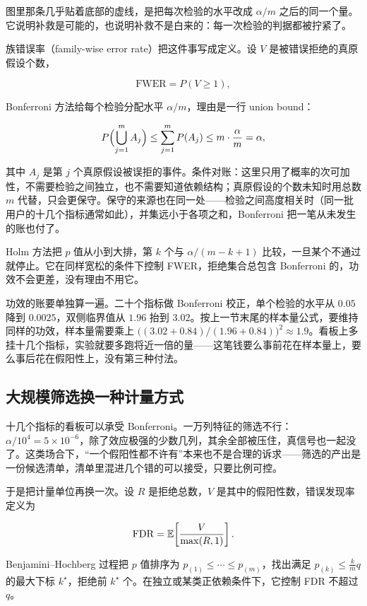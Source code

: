 图里那条几乎贴着底部的虚线，是把每次检验的水平改成 \(\alpha/m\) 之后的同一个量。它说明补救是可能的，也说明补救不是白来的：每一次检验的判据都被拧紧了。

族错误率（family-wise error rate）把这件事写成定义。设 \(V\) 是被错误拒绝的真原假设个数，

\[
\mathrm{FWER}=P(V\ge 1),
\]

Bonferroni 方法给每个检验分配水平 \(\alpha/m\)，理由是一行 union bound：

\[
P\Bigl(\bigcup_{j=1}^{m}A_j\Bigr)\le\sum_{j=1}^{m}P(A_j)\le m\cdot\frac{\alpha}{m}=\alpha ,
\]

其中 \(A_j\) 是第 \(j\) 个真原假设被误拒的事件。条件对账：这里只用了概率的次可加性，不需要检验之间独立，也不需要知道依赖结构；真原假设的个数未知时用总数 \(m\) 代替，只会更保守。保守的来源也在同一处——检验之间高度相关时（同一批用户的十几个指标通常如此），并集远小于各项之和，Bonferroni 把一笔从未发生的账也付了。

Holm 方法把 \(p\) 值从小到大排，第 \(k\) 个与 \(\alpha/(m-k+1)\) 比较，一旦某个不通过就停止。它在同样宽松的条件下控制 FWER，拒绝集合总包含 Bonferroni 的，功效不会更差，没有理由不用它。

功效的账要单独算一遍。二十个指标做 Bonferroni 校正，单个检验的水平从 \(0.05\) 降到 \(0.0025\)，双侧临界值从 \(1.96\) 抬到 \(3.02\)。按上一节末尾的样本量公式，要维持同样的功效，样本量需要乘上 \(\bigl((3.02+0.84)/(1.96+0.84)\bigr)^{2}\approx 1.9\)。看板上多挂十几个指标，实验就要多跑将近一倍的量——这笔钱要么事前花在样本量上，要么事后花在假阳性上，没有第三种付法。

\subsection{大规模筛选换一种计量方式}

十几个指标的看板可以承受 Bonferroni。一万列特征的筛选不行：\(\alpha/10^{4}=5\times 10^{-6}\)，除了效应极强的少数几列，其余全部被压住，真信号也一起没了。这类场合下，``一个假阳性都不许有''本来也不是合理的诉求——筛选的产出是一份候选清单，清单里混进几个错的可以接受，只要比例可控。

于是把计量单位再换一次。设 \(R\) 是拒绝总数，\(V\) 是其中的假阳性数，错误发现率定义为

\[
\mathrm{FDR}=\mathbb{E}\!\left[\frac{V}{\max(R,1)}\right].
\]

Benjamini--Hochberg 过程把 \(p\) 值排序为 \(p_{(1)}\le\cdots\le p_{(m)}\)，找出满足 \(p_{(k)}\le \frac{k}{m}q\) 的最大下标 \(k^\star\)，拒绝前 \(k^\star\) 个。在独立或某类正依赖条件下，它控制 FDR 不超过 \(q\)。

